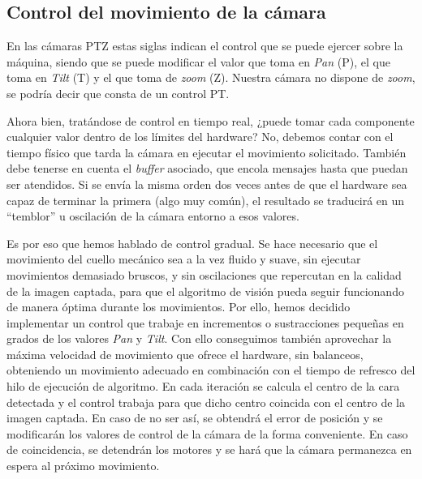 \subsection{Control del movimiento de la cámara}
En las cámaras PTZ estas siglas indican el control que se puede ejercer sobre la máquina, siendo que se puede modificar el valor que toma en \textit{Pan} (P), el que toma en \textit{Tilt} (T) y el que toma de \textit{zoom} (Z). Nuestra cámara no dispone de \textit{zoom}, se podría decir que consta de un control PT.

Ahora bien, tratándose de control en tiempo real, ¿puede tomar cada componente cualquier valor dentro de los límites del hardware? No, debemos contar con el tiempo físico que tarda la cámara en ejecutar el movimiento solicitado. También debe tenerse en cuenta el \textit{buffer} asociado, que encola mensajes hasta que puedan ser atendidos. Si se envía la misma orden dos veces antes de que el hardware sea capaz de terminar la primera (algo muy común), el resultado se traducirá en un “temblor” u oscilación de la cámara entorno a esos valores.

Es por eso que hemos hablado de control gradual. Se hace necesario que el movimiento del cuello mecánico sea a la vez fluido y suave, sin ejecutar movimientos demasiado bruscos, y sin oscilaciones que repercutan en la calidad de la imagen captada, para que el algoritmo de visión pueda seguir funcionando de manera óptima durante los movimientos.
Por ello, hemos decidido implementar un control que trabaje en incrementos o sustracciones pequeñas en grados de los valores \textit{Pan} y \textit{Tilt}. Con ello conseguimos también aprovechar la máxima velocidad de movimiento que ofrece el hardware, sin balanceos, obteniendo un movimiento adecuado en combinación con el tiempo de refresco del hilo de ejecución de algoritmo. En cada iteración se calcula el centro de la cara detectada y el control trabaja para que dicho centro coincida con el centro de la imagen captada. En caso de no ser así, se obtendrá el error de posición y se modificarán los valores de control de la cámara de la forma conveniente. En caso de coincidencia, se detendrán los motores y se hará que la cámara permanezca en espera al próximo movimiento.

